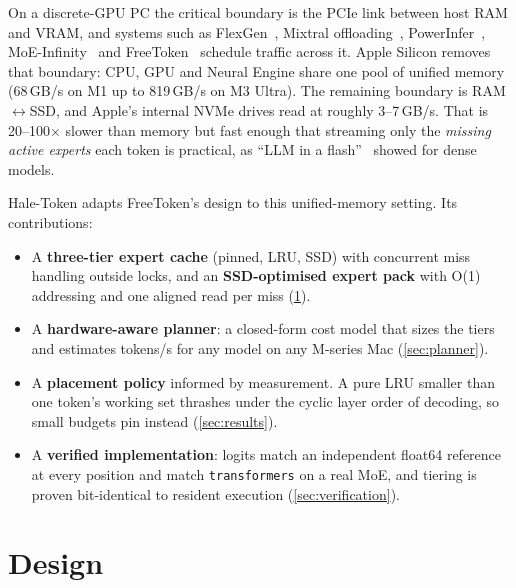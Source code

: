 \documentclass[11pt]{article}
\begin{document}
On a discrete-GPU PC the critical boundary is the PCIe link between host RAM and VRAM, and
systems such as FlexGen~\cite{sheng2023flexgen}, Mixtral offloading~\cite{eliseev2023offload},
PowerInfer~\cite{song2023powerinfer}, MoE-Infinity~\cite{xue2024moeinfinity} and
FreeToken~\cite{freetoken2026} schedule traffic across it. Apple Silicon removes that boundary:
CPU, GPU and Neural Engine share one pool of unified memory (68\,GB/s on M1 up to 819\,GB/s on
M3 Ultra). The remaining boundary is RAM$\leftrightarrow$SSD, and Apple's internal NVMe drives
read at roughly 3--7\,GB/s. That is 20--100$\times$ slower than memory but fast enough that
streaming only the \emph{missing active experts} each token is practical, as ``LLM in a
flash''~\cite{alizadeh2024flash} showed for dense models.

Hale-Token adapts FreeToken's design to this unified-memory setting. Its contributions:
\begin{itemize}
  \item A \textbf{three-tier expert cache} (pinned, LRU, SSD) with concurrent miss handling
        outside locks, and an \textbf{SSD-optimised expert pack} with O(1) addressing and one
        aligned read per miss (\cref{sec:tiers}).
  \item A \textbf{hardware-aware planner}: a closed-form cost model that sizes the tiers and
        estimates tokens/s for any model on any M-series Mac (\cref{sec:planner}).
  \item A \textbf{placement policy} informed by measurement. A pure LRU smaller than one
        token's working set thrashes under the cyclic layer order of decoding, so small
        budgets pin instead (\cref{sec:results}).
  \item A \textbf{verified implementation}: logits match an independent float64 reference at
        every position and match \texttt{transformers} on a real MoE, and tiering is proven
        bit-identical to resident execution (\cref{sec:verification}).
\end{itemize}

\section{Design}
\label{sec:tiers}
\end{document}
